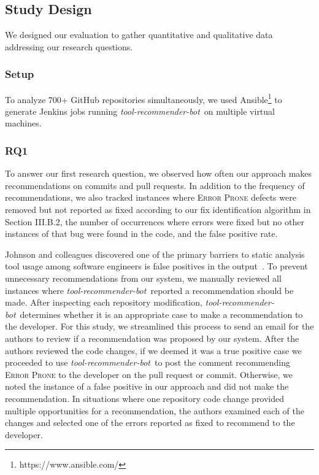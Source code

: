 \documentclass[sigconf,review,anonymous]{acmart}
\newcommand{\tool}{\textsl{tool-recommender-bot}}
\begin{document}
\subsection{Study Design}

We designed our evaluation to gather quantitative and qualitative data addressing our research questions.  

\subsubsection{Setup}

To analyze 700+ GitHub repositories simultaneously, we used Ansible\footnote{https://www.ansible.com/} to generate Jenkins jobs running \tool~on multiple virtual machines.

\subsubsection{RQ1}

To answer our first research question, we observed how often our approach makes recommendations on commits and pull requests. In addition to the frequency of recommendations, we also tracked instances where \textsc{Error Prone} defects were removed but not reported as fixed according to our fix identification algorithm in Section III.B.2, the number of occurrences where errors were fixed but no other instances of that bug were found in the code, and the false positive rate.

Johnson and colleagues discovered one of the primary barriers to static analysis tool usage among software engineers is false positives in the output~\cite{Johnson2013Why}. To prevent unnecessary recommendations from our system, we manually reviewed all instances where \tool~reported a recommendation should be made. After inspecting each repository modification, \tool~determines whether it is an appropriate case to make a recommendation to the developer. For this study, we streamlined this process to send an email for the authors to review if a recommendation was proposed by our system. After the authors reviewed the code changes, if we deemed it was a true positive case we proceeded to use \tool~to post the comment recommending \textsc{Error Prone} to the developer on the pull request or commit. Otherwise, we noted the instance of a false positive in our approach and did not make the recommendation. In situations where one repository code change provided multiple opportunities for a recommendation, the authors examined each of the changes and selected one of the errors reported as fixed to recommend to the developer.
\end{document}
